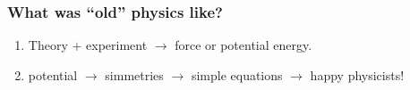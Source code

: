 \documentclass[ukenglish]{beamer}
\begin{document}
\begin{frame}
    \frametitle{What was ``old'' physics like?}
    \begin{enumerate}
        \item 
    Theory $+$ experiment $\longrightarrow$ force or potential energy.
\item potential $\rightarrow$ simmetries $\rightarrow$ simple equations
    $\rightarrow$ happy physicists!
    \end{enumerate}
\end{frame}
\end{document}
